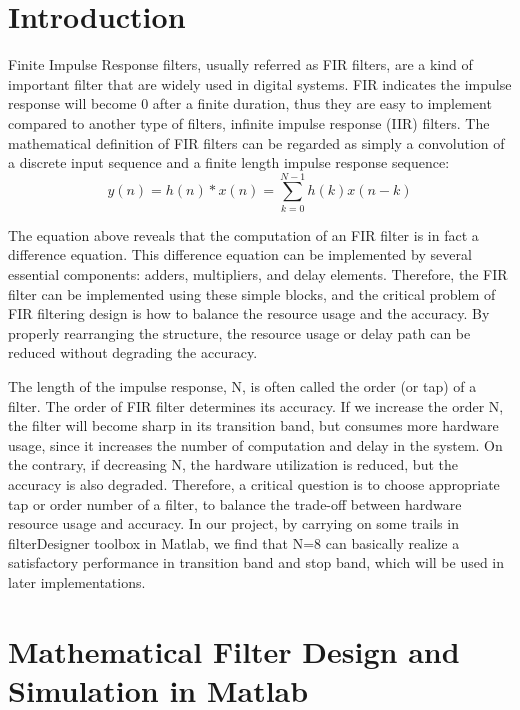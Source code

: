\documentclass[a4paper]{article}
\begin{document}
\section{Introduction}
Finite Impulse Response filters, usually referred as FIR filters, are a kind of important filter that are widely used in digital systems. FIR indicates the impulse response will become 0 after a finite duration, thus they are easy to implement compared to another type of filters, infinite impulse response (IIR) filters. The mathematical definition of FIR filters can be regarded as simply a convolution of a discrete input sequence and a finite length impulse response sequence:
\begin{equation*}
    y(n) = h(n)*x(n) = \sum_{k=0}^{N-1}h(k)x(n-k)
\end{equation*}

The equation above reveals that the computation of an FIR filter is in fact a difference equation. This difference equation can be implemented by several essential components: adders, multipliers, and delay elements. Therefore, the FIR filter can be implemented using these simple blocks, and the critical problem of FIR filtering design is how to balance the resource usage and the accuracy. By properly rearranging the structure, the resource usage or delay path can be reduced without degrading the accuracy.

The length of the impulse response, N, is often called the order (or tap) of a filter. The order of FIR filter determines its accuracy. If we increase the order N, the filter will become sharp in its transition band, but consumes more hardware usage, since it increases the number of computation and delay in the system. On the contrary, if decreasing N, the hardware utilization is reduced, but the accuracy is also degraded. Therefore, a critical question is to choose appropriate tap or order number of a filter, to balance the trade-off between hardware resource usage and accuracy. In our project, by carrying on some trails in filterDesigner toolbox in Matlab, we find that N=8 can basically realize a satisfactory performance in transition band and stop band, which will be used in later implementations.

\section{Mathematical Filter Design and Simulation in Matlab}
\end{document}
